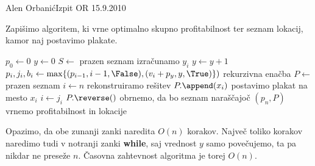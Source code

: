 \begin{naloga}{Alen Orbanić}{Izpit OR 15.9.2010}
\begin{odgovor}
\begin{enumerate}[(a)]
Zapišimo algoritem, ki vrne optimalno skupno profitabilnost
ter seznam lokacij, kamor naj postavimo plakate.
\begin{small}
\begin{algorithmic}
    \State $p_0 \gets 0$
    \State $y \gets 0$
    \State $S \gets$ prazen seznam
         \hfill izračunamo $y_i$
            \State $y \gets y+1$
        \EndWhile
        \State $p_i, j_i, b_i \gets \max\{(p_{i-1}, i-1, \False),
                                          (v_i + p_y, y, \True)\})$
            \hfill rekurzivna enačba
    \EndFor
    \State $P \gets$ prazen seznam
    \State $i \gets n$
     \hfill rekonstruiramo rešitev
            \State $P.\append(x_i)$ \hfill postavimo plakat na mesto $x_i$
        \EndIf
        \State $i \gets j_i$
    \EndWhile
    \State $P.\reverse()$ \hfill obrnemo, da bo seznam naraščajoč
    \State \Return $(p_n, P)$ \hfill vrnemo profitabilnost in lokacije
\EndFunction
\end{algorithmic}
\end{small}
Opazimo, da obe zunanji zanki naredita $O(n)$ korakov.
Največ toliko korakov naredimo tudi v notranji zanki {\bf while},
saj vrednost $y$ samo povečujemo, ta pa nikdar ne preseže $n$.
Časovna zahtevnost algoritma je torej $O(n)$.
\end{enumerate}
\end{odgovor}
\end{naloga}
